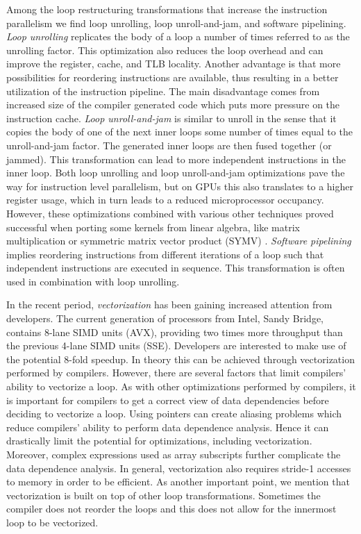Among the loop restructuring transformations that increase the instruction
parallelism we find loop unrolling, loop unroll-and-jam, and software
pipelining. \textit{Loop unrolling} replicates the body of a loop a number of
times referred to as the unrolling factor. This optimization also reduces the loop
overhead and can improve the register, cache, and TLB locality. Another
advantage is that more possibilities for reordering instructions are available,
thus resulting in a better utilization of the instruction pipeline. The main
disadvantage comes from increased size of the compiler generated code which puts
more pressure on the instruction cache. \textit{Loop unroll-and-jam} is similar
to unroll in the sense that it copies the body of one of the next inner loops some number
of times equal to the unroll-and-jam factor. The generated inner loops are then
fused together (or jammed). This transformation can lead to more independent
instructions in the inner loop. Both loop unrolling and loop unroll-and-jam
optimizations pave the way for instruction level parallelism, but on GPUs this
also translates to a higher register usage, which in turn leads to a reduced
microprocessor occupancy. However, these optimizations combined with various
other techniques proved successful when porting some kernels from linear
algebra, like matrix multiplication \cite{Volkov:2008:BGT:1413370.1413402} or
symmetric matrix vector product (SYMV) \cite{Nath:2011:OSD:2063384.2063392}.
\textit{Software pipelining} implies reordering instructions from different
iterations of a loop such that independent instructions are executed in
sequence. This transformation is often used in combination with loop unrolling.

In the recent period, \textit{vectorization} has been gaining increased
attention from developers. The current generation of processors from Intel,
Sandy Bridge, contains 8-lane SIMD units (AVX), providing two times more
throughput than the previous 4-lane SIMD units (SSE). Developers are interested
to make use of the potential 8-fold speedup. In theory this can be achieved
through vectorization performed by compilers. However, there are several factors
that limit compilers' ability to vectorize a loop. As with other optimizations
performed by compilers, it is important for compilers to get a correct view of
data dependencies before deciding to vectorize a loop. Using pointers can create
aliasing problems which reduce compilers' ability to perform data dependence
analysis. Hence it can drastically limit the potential for optimizations,
including vectorization. Moreover, complex expressions used as array subscripts
further complicate the data dependence analysis. In general, vectorization also
requires stride-1 accesses to memory in order to be efficient. As another
important point, we mention that vectorization is built on top of other loop
transformations. Sometimes the compiler does not reorder the loops and this does
not allow for the innermost loop to be vectorized.

